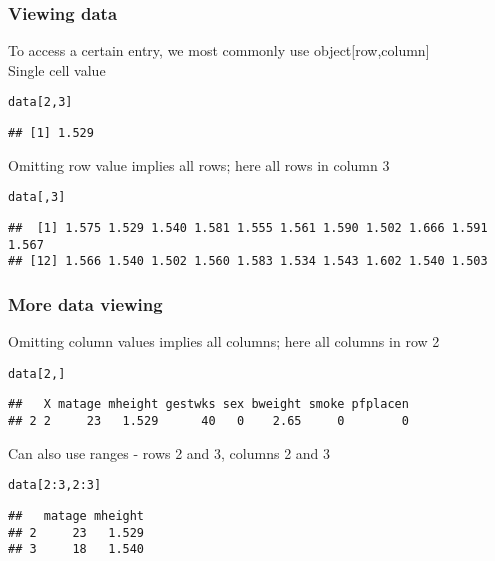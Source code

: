 \documentclass{beamer}\usepackage[]{graphicx}\usepackage[]{color}
\makeatletter
\newcommand{\hlnum}[1]{\textcolor[rgb]{0.686,0.059,0.569}{#1}}%
\newcommand{\hlopt}[1]{\textcolor[rgb]{0,0,0}{#1}}%
\newcommand{\hlstd}[1]{\textcolor[rgb]{0.345,0.345,0.345}{#1}}%
\newenvironment{kframe}{%
 \def\at@end@of@kframe{}%
 \ifinner\ifhmode%
  \def\at@end@of@kframe{\end{minipage}}%
  \begin{minipage}{\columnwidth}%
 \fi\fi%
 \def\FrameCommand##1{\hskip\@totalleftmargin \hskip-\fboxsep
 \colorbox{shadecolor}{##1}\hskip-\fboxsep
     \hskip-\linewidth \hskip-\@totalleftmargin \hskip\columnwidth}%
 \MakeFramed {\advance\hsize-\width
   \@totalleftmargin\z@ \linewidth\hsize
   \@setminipage}}%
 {\par\unskip\endMakeFramed%
 \at@end@of@kframe}
\newenvironment{knitrout}{}{} %
\makeatother
\begin{document}
\begin{frame}[fragile]\frametitle{Viewing data}
To access a certain entry, we most commonly use object[row,column] \\
Single cell value
\begin{knitrout}
\color{fgcolor}\begin{kframe}
\begin{alltt}
\hlstd{data[}\hlnum{2}\hlstd{,} \hlnum{3}\hlstd{]}
\end{alltt}
\begin{verbatim}
## [1] 1.529
\end{verbatim}
\end{kframe}
\end{knitrout}
Omitting row value implies all rows; here all rows in column 3
\begin{knitrout}
\color{fgcolor}\begin{kframe}
\begin{alltt}
\hlstd{data[,} \hlnum{3}\hlstd{]}
\end{alltt}
\begin{verbatim}
##  [1] 1.575 1.529 1.540 1.581 1.555 1.561 1.590 1.502 1.666 1.591 1.567
## [12] 1.566 1.540 1.502 1.560 1.583 1.534 1.543 1.602 1.540 1.503
\end{verbatim}
\end{kframe}
\end{knitrout}
\end{frame}

\begin{frame}[fragile]\frametitle{More data viewing}
Omitting column values implies all columns; here all columns in row 2
\begin{knitrout}
\color{fgcolor}\begin{kframe}
\begin{alltt}
\hlstd{data[}\hlnum{2}\hlstd{, ]}
\end{alltt}
\begin{verbatim}
##   X matage mheight gestwks sex bweight smoke pfplacen
## 2 2     23   1.529      40   0    2.65     0        0
\end{verbatim}
\end{kframe}
\end{knitrout}
Can also use ranges - rows 2 and 3, columns 2 and 3
\begin{knitrout}
\color{fgcolor}\begin{kframe}
\begin{alltt}
\hlstd{data[}\hlnum{2}\hlopt{:}\hlnum{3}\hlstd{,} \hlnum{2}\hlopt{:}\hlnum{3}\hlstd{]}
\end{alltt}
\begin{verbatim}
##   matage mheight
## 2     23   1.529
## 3     18   1.540
\end{verbatim}
\end{kframe}
\end{knitrout}
\end{frame}
\end{document}
